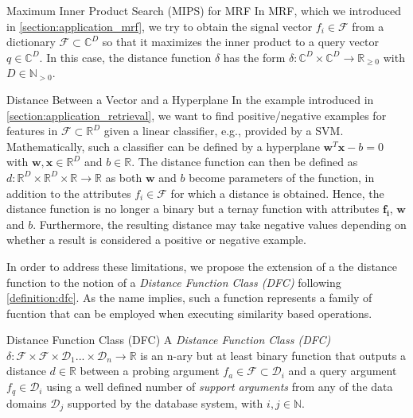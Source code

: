 \begin{example}[label=example:mrf]{Maximum Inner Product Search (MIPS) for MRF}{}
In MRF, which we introduced in \cref{section:application_mrf}, we try to obtain the signal vector $f_i \in \mathcal{F}$ from a dictionary $\mathcal{F} \subset \mathbb{C}^{D}$ so that it maximizes the inner product to a query vector $q \in \mathbb{C}^{D}$. In this case, the distance function $\delta$ has the form $\delta \colon \mathbb{C}^{D} \times \mathbb{C}^{D} \to \mathbb{R}_{\geq 0}$ with $D \in \mathbb{N}_{>0}$.
\end{example}

\begin{example}[label=example:svmdistance]{Distance Between a Vector and a Hyperplane}{}
In the example introduced in \cref{section:application_retrieval}, we want to find positive/negative examples for features in $\mathcal{F} \subset \mathbb{R}^{D}$ given a linear classifier, e.g., provided by a SVM. Mathematically, such a classifier can be defined by a hyperplane $\mathbf{w}^T\mathbf{x} - b = 0$ with $\mathbf{w},\mathbf{x} \in \mathbb{R}^{D}$ and $b \in \mathbb{R}$. The distance function can then be defined as $d \colon \mathbb{R}^{D} \times \mathbb{R}^{D} \times \mathbb{R} \to \mathbb{R}$ as both $\mathbf{w}$ and $b$ become parameters of the function, in addition to the attributes $f_i \in \mathcal{F}$ for which a distance is obtained. Hence, the distance function is no longer a binary but a ternay function with attributes $\mathbf{f_{i}}$, $\mathbf{w}$ and $b$. Furthermore, the resulting distance may take negative values depending on whether a result is considered a positive or negative example.
\end{example}

In order to address these limitations, we propose the extension of a the distance function to the notion of a \emph{Distance Function Class (DFC)} following \cref{definition:dfc}. As the name implies, such a function represents a family of fucntion that can be employed when executing similarity based operations.

\begin{definition}[label=definition:spf]{Distance Function Class (DFC)}{}
    A \emph{Distance Function Class (DFC)} $\delta \colon \mathcal{F} \times \mathcal{F} \times \mathcal{D}_{1} ... \times \mathcal{D}_{n} \to \mathbb{R}$ is an n-ary but at least binary function that outputs a distance $d \in \mathbb{R}$ between a probing argument $f_{a} \in \mathcal{F} \subset \mathcal{D}_i$ and a query argument $f_{q} \in \mathcal{D}_i$ using a well defined number of \emph{support arguments} from any of the data domains $\mathcal{D}_{j}$ supported by the database system, with $i,j \in \mathbb{N}$.
\end{definition}

